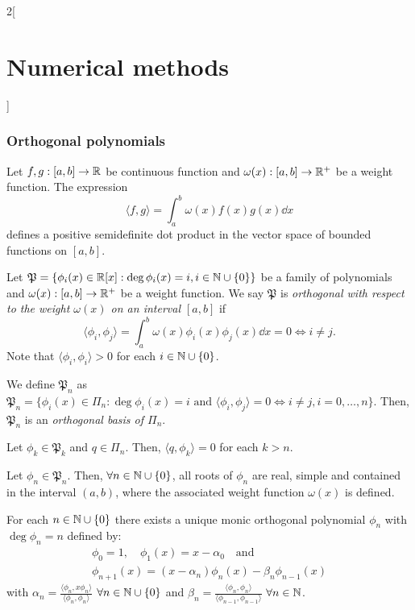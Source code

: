 \documentclass[../../../main.tex]{subfiles}
\begin{document}
\begin{multicols}{2}[\section{Numerical methods}]
\subsubsection*{Orthogonal polynomials}
\begin{definition}
    Let $f,g:[a,b]\rightarrow\mathbb{R}$ be continuous function and $\omega(x):[a,b]\rightarrow\mathbb{R}^+$ be a weight function. The expression $$\langle f,g\rangle=\int_a^b\omega(x)f(x)g(x)\dd x$$ defines a positive semidefinite dot product in the vector space of bounded functions on $[a,b]$.
\end{definition}
\begin{definition}
    Let $\mathfrak{P}=\{\phi_i(x)\in\mathbb{R}[x]:\deg \phi_i(x)=i, i\in\mathbb{N}\cup\{0\}\}$ be a family of polynomials and $\omega(x):[a,b]\rightarrow\mathbb{R}^+$ be a weight function. We say $\mathfrak{P}$ is \textit{orthogonal with respect to the weight $\omega(x)$ on an interval $[a,b]$} if $$\langle \phi_i,\phi_j\rangle=\int_a^b\omega(x)\phi_i(x)\phi_j(x)\dd x=0\iff i\ne j.$$
    Note that $\langle \phi_i,\phi_i\rangle>0$ for each $i\in\mathbb{N}\cup\{0\}$.
\end{definition}
\begin{lemma}
    We define $\mathfrak{P}_n$ as $\mathfrak{P}_n=\{\phi_i(x)\in\Pi_n:\deg\phi_i(x)=i\text{ and }\langle \phi_i,\phi_j\rangle=0\iff i\ne j,  i=0,\ldots,n\}$. Then, $\mathfrak{P}_n$ is an \textit{orthogonal basis of $\Pi_n$}. 
\end{lemma}
\begin{lemma}
    Let $\phi_k\in\mathfrak{P}_k$ and $q\in\Pi_n$. Then, $\langle q,\phi_k\rangle=0$ for each $k>n$.
\end{lemma}
\begin{lemma}
    Let $\phi_n\in\mathfrak{P}_n$. Then, $\forall n\in\mathbb{N}\cup\{0\}$, all roots of $\phi_n$ are real, simple and contained in the interval $(a,b)$, where the associated weight function $\omega(x)$ is defined.
\end{lemma}
\begin{theorem}
    For each $n\in\mathbb{N}\cup\{0\}$ there exists a unique monic orthogonal polynomial $\phi_n$ with $\deg\phi_n=n$ defined by:
    \begin{gather*}
        \phi_0=1,\quad\phi_1(x)=x-\alpha_0\quad \text{and}\\
        \phi_{n+1}(x)=(x-\alpha_n)\phi_n(x)-\beta_n\phi_{n-1}(x)
    \end{gather*}
    with $\alpha_n=\frac{\langle\phi_n,x\phi_n\rangle}{\langle\phi_n,\phi_n\rangle}$ $\forall n\in\mathbb{N}\cup\{0\}$ and $\beta_n=\frac{\langle\phi_n,\phi_n\rangle}{\langle\phi_{n-1},\phi_{n-1}\rangle}$ $\forall n\in\mathbb{N}$.

\end{theorem}
\end{multicols}
\end{document}
